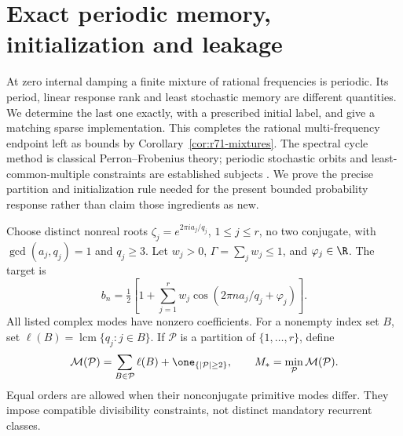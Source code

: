 \section{Exact periodic memory, initialization and leakage}\label{sec:r72-periodic}
At zero internal damping a finite mixture of rational frequencies is periodic. Its period, linear response rank and least stochastic memory are different quantities. We determine the last one exactly, with a prescribed initial label, and give a matching sparse implementation. This completes the rational multi-frequency endpoint left as bounds by Corollary~\ref{cor:r71-mixtures}. The spectral cycle method is classical Perron--Frobenius theory; periodic stochastic orbits and least-common-multiple constraints are established subjects \cite{Nussbaum98,BenvenutiFarina04}. We prove the precise partition and initialization rule needed for the present bounded probability response rather than claim those ingredients as new.

Choose distinct nonreal roots $\zeta_j=e^{2\pi ia_j/q_j}$, $1\le j\le r$, no two conjugate, with $\gcd(a_j,q_j)=1$ and $q_j\ge3$. Let $w_j>0$, $\Gamma=\sum_jw_j\le1$, and $\varphi_j\in\R$. The target is
\begin{equation}\label{eq:r72-periodic-response}
 b_n=\tfrac12\left[1+\sum_{j=1}^r w_j
                \cos(2\pi n a_j/q_j+\varphi_j)\right].
\end{equation}
All listed complex modes have nonzero coefficients. For a nonempty index set $B$, set $\ell(B)=\operatorname{lcm}\{q_j:j\in B\}$. If $\mathcal P$ is a partition of $\{1,\ldots,r\}$, define
\begin{equation}\label{eq:r72-partition-cost}
 \mathcal M(\mathcal P)=\sum_{B\in\mathcal P}\ell(B)
                       +\one_{\{|\mathcal P|\ge2\}},
 \qquad M_* =\min_{\mathcal P}\mathcal M(\mathcal P).
\end{equation}
Equal orders are allowed when their nonconjugate primitive modes differ. They impose compatible divisibility constraints, not distinct mandatory recurrent classes.

